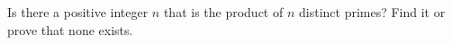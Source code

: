 Is there a positive integer $n$ that is the product of $n$ distinct primes? Find it or prove that none exists.
